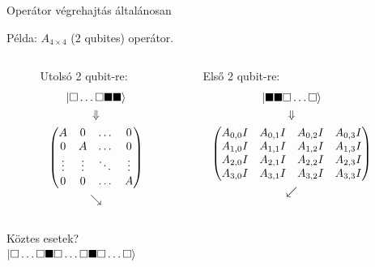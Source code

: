 \documentclass[aspectratio=169]{beamer}
\begin{document}
\begin{frame}{Operátor végrehajtás általánosan}

Példa: $A_{4\times{}4}$ ($2$ qubites) operátor.
\vspace{0.5cm}
\begin{columns}
  \begin{column}[t]{0.05\textwidth}
  \end{column}
  \begin{column}[t]{0.4\textwidth}
    Utolsó 2 qubit-re:
    \begin{gather*}
      \ket{\square{}\dots{}\square{}\blacksquare{}\blacksquare{}} \\
      \Downarrow  \\
      \begin{pmatrix}
        A & 0  & \dots{} & 0 \\
       0 & A  & \dots{} & 0 \\ 
       \vdots{} & \vdots{}  & \ddots{} & \vdots{} \\
       0 & 0  & \dots{} & A \\
     \end{pmatrix} \\
     \searrow
    \end{gather*}
  \end{column}
  \begin{column}[t]{0.1\textwidth}
  \end{column}
  \begin{column}[t]{0.4\textwidth}
    Első 2 qubit-re:
    \begin{gather*}
      \ket{\blacksquare{}\blacksquare{}\square{}\dots{}\square{}} \\
      \Downarrow \\
      \begin{pmatrix}
        A_{0,0} I & A_{0,1} I & A_{0,2} I & A_{0,3} I  \\
        A_{1,0} I & A_{1,1} I & A_{1,2} I & A_{1,3} I \\
        A_{2,0} I & A_{2,1} I & A_{2,2} I & A_{2,3} I \\
        A_{3,0} I & A_{3,1} I & A_{3,2} I & A_{3,3} I \\
      \end{pmatrix}\\
     \swarrow
    \end{gather*}
  \end{column}
  \begin{column}[t]{0.05\textwidth}
  \end{column}
  \end{columns}

\begin{center}
  Köztes esetek?\\
  $\ket{\square{}\dots{}\square{}\blacksquare{}\square{}\dots{}\square{}\blacksquare{}\square{}\dots{}\square{}} $
\end{center}

\end{frame}
\end{document}
